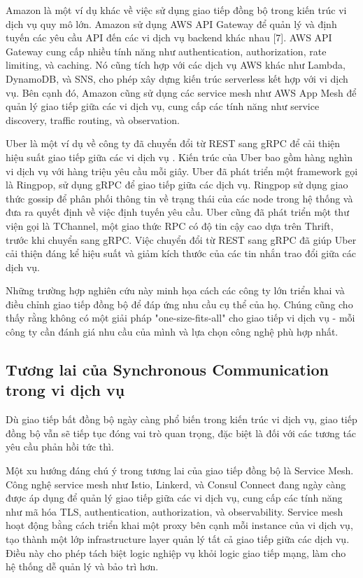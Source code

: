 Amazon là một ví dụ khác về việc sử dụng giao tiếp đồng bộ trong kiến trúc vi dịch vụ quy mô lớn. Amazon sử dụng AWS API Gateway để quản lý và định tuyến các yêu cầu API đến các vi dịch vụ backend khác nhau [7]. AWS API Gateway cung cấp nhiều tính năng như authentication, authorization, rate limiting, và caching. Nó cũng tích hợp với các dịch vụ AWS khác như Lambda, DynamoDB, và SNS, cho phép xây dựng kiến trúc serverless kết hợp với vi dịch vụ. Bên cạnh đó, Amazon cũng sử dụng các service mesh như AWS App Mesh để quản lý giao tiếp giữa các vi dịch vụ, cung cấp các tính năng như service discovery, traffic routing, và observation.

Uber là một ví dụ về công ty đã chuyển đổi từ REST sang gRPC để cải thiện hiệu suất giao tiếp giữa các vi dịch vụ \cite{beyer2018}. Kiến trúc của Uber bao gồm hàng nghìn vi dịch vụ với hàng triệu yêu cầu mỗi giây. Uber đã phát triển một framework gọi là Ringpop, sử dụng gRPC để giao tiếp giữa các dịch vụ. Ringpop sử dụng giao thức gossip để phân phối thông tin về trạng thái của các node trong hệ thống và đưa ra quyết định về việc định tuyến yêu cầu. Uber cũng đã phát triển một thư viện gọi là TChannel, một giao thức RPC có độ tin cậy cao dựa trên Thrift, trước khi chuyển sang gRPC. Việc chuyển đổi từ REST sang gRPC đã giúp Uber cải thiện đáng kể hiệu suất và giảm kích thước của các tin nhắn trao đổi giữa các dịch vụ.

Những trường hợp nghiên cứu này minh họa cách các công ty lớn triển khai và điều chỉnh giao tiếp đồng bộ để đáp ứng nhu cầu cụ thể của họ. Chúng cũng cho thấy rằng không có một giải pháp "one-size-fits-all" cho giao tiếp vi dịch vụ - mỗi công ty cần đánh giá nhu cầu của mình và lựa chọn công nghệ phù hợp nhất.

\subsection{Tương lai của Synchronous Communication trong vi dịch vụ}
Dù giao tiếp bất đồng bộ ngày càng phổ biến trong kiến trúc vi dịch vụ, giao tiếp đồng bộ vẫn sẽ tiếp tục đóng vai trò quan trọng, đặc biệt là đối với các tương tác yêu cầu phản hồi tức thì.

Một xu hướng đáng chú ý trong tương lai của giao tiếp đồng bộ là Service Mesh. Công nghệ service mesh như Istio, Linkerd, và Consul Connect đang ngày càng được áp dụng để quản lý giao tiếp giữa các vi dịch vụ, cung cấp các tính năng như mã hóa TLS, authentication, authorization, và observability. Service mesh hoạt động bằng cách triển khai một proxy bên cạnh mỗi instance của vi dịch vụ, tạo thành một lớp infrastructure layer quản lý tất cả giao tiếp giữa các dịch vụ. Điều này cho phép tách biệt logic nghiệp vụ khỏi logic giao tiếp mạng, làm cho hệ thống dễ quản lý và bảo trì hơn.

